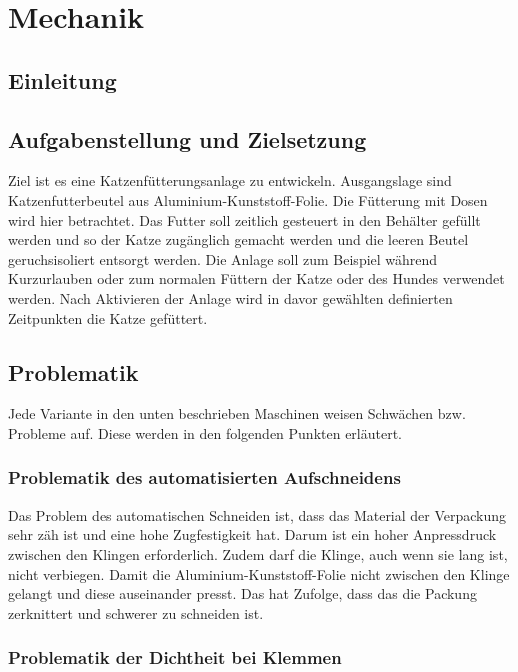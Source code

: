 \chapter{Mechanik}
\section{Einleitung}
\section{Aufgabenstellung und Zielsetzung}

Ziel ist es eine Katzenfütterungsanlage zu entwickeln. Ausgangslage sind Katzenfutterbeutel aus Aluminium-Kunststoff-Folie. Die Fütterung mit Dosen wird hier betrachtet. Das Futter soll zeitlich gesteuert in den Behälter gefüllt werden und so der Katze zugänglich gemacht werden und die leeren Beutel geruchsisoliert entsorgt werden. Die Anlage soll zum Beispiel während Kurzurlauben oder zum normalen Füttern der Katze oder des Hundes verwendet werden. Nach Aktivieren der Anlage wird in davor gewählten definierten Zeitpunkten die Katze gefüttert. 


\section{Problematik}

Jede Variante in den unten beschrieben Maschinen weisen Schwächen bzw. Probleme auf. Diese werden in den folgenden Punkten erläutert.

\subsection{Problematik des automatisierten Aufschneidens}

Das Problem des automatischen Schneiden ist, dass das Material der Verpackung sehr zäh ist und eine hohe Zugfestigkeit hat. Darum ist ein hoher Anpressdruck zwischen den Klingen erforderlich. Zudem darf die Klinge, auch wenn sie lang ist, nicht verbiegen. Damit die Aluminium-Kunststoff-Folie nicht zwischen den Klinge gelangt und diese auseinander presst. Das hat Zufolge, dass das die Packung zerknittert und schwerer zu schneiden ist. 

\subsection{Problematik der Dichtheit bei Klemmen}

